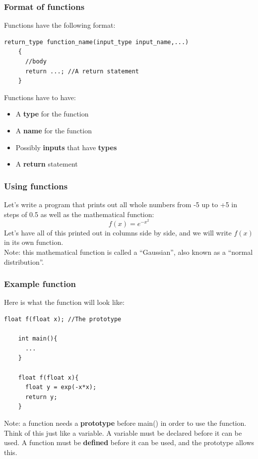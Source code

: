 \documentclass{beamer}
\begin{document}
\begin{frame}[fragile]
  \frametitle{Format of functions}
  Functions have the following format:
  \begin{lstlisting}[style=customc]
    return_type function_name(input_type input_name,...)
    {
      //body
      return ...; //A return statement
    }
  \end{lstlisting}
  Functions have to have:
  \begin{itemize}
    \item A \textbf{type} for the function
    \item A \textbf{name} for the function
    \item Possibly \textbf{inputs} that have \textbf{types}
    \item A \textbf{return} statement
  \end{itemize}
\end{frame}

\begin{frame}[fragile]
  \frametitle{Using functions}
  Let's write a program that prints out all whole numbers from 
  -5 up to +5 in steps of 0.5 as well as the mathematical function:
  \begin{equation*}
    f(x) = e^{-x^2}
  \end{equation*}
  Let's have all of this printed out in columns side by side, and
  we will write $f(x)$ in its own function.\\
  \vspace{12pt}
  Note: this mathematical function is called a ``Gaussian'', also known
  as a ``normal distribution''.
\end{frame}

\begin{frame}[fragile]
  \frametitle{Example function}
  Here is what the function will look like:
  \begin{lstlisting}[style=customc]
    float f(float x); //The prototype

    int main(){
      ...
    }
    
    float f(float x){
      float y = exp(-x*x);
      return y;
    }
  \end{lstlisting}
  Note: a function needs a \textbf{prototype} before main() in order
  to use the function. Think of this just like a variable. A variable
  must be declared before it can be used. A function must be \textbf{defined}
  before it can be used, and the prototype allows this.
\end{frame}
\end{document}
